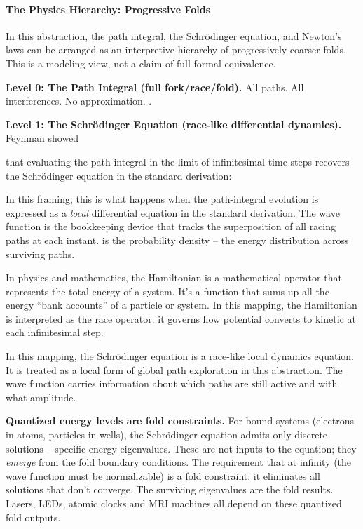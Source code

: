 \documentclass[
]{article}
\begin{document}
\paragraph{\texorpdfstring{\textbf{The Physics Hierarchy: Progressive
Folds}}{The Physics Hierarchy: Progressive Folds}}\label{the-physics-hierarchy-progressive-folds}

In this abstraction, the path integral, the Schrödinger equation, and
Newton's laws can be arranged as an interpretive hierarchy of
progressively coarser folds. This is a modeling view, not a claim of
full formal equivalence.

\textbf{Level 0: The Path Integral (full fork/race/fold).} All paths.
All interferences. No approximation. .

\textbf{Level 1: The Schrödinger Equation (race-like differential
dynamics).} Feynman showed

that evaluating the path integral in the limit of infinitesimal time
steps recovers the Schrödinger equation in the standard derivation:

In this framing, this is what happens when the path-integral evolution
is expressed as a \emph{local} differential equation in the standard
derivation. The wave function is the bookkeeping device that tracks the
superposition of all racing paths at each instant. is the probability
density -- the energy distribution across surviving paths.

In physics and mathematics, the Hamiltonian is a mathematical operator
that represents the total energy of a system. It's a function that sums
up all the energy ``bank accounts'' of a particle or system. In this
mapping, the Hamiltonian is interpreted as the race operator: it governs
how potential converts to kinetic at each infinitesimal step.

In this mapping, the Schrödinger equation is a race-like local dynamics
equation. It is treated as a local form of global path exploration in
this abstraction. The wave function carries information about which
paths are still active and with what amplitude.

\textbf{Quantized energy levels are fold constraints.} For bound systems
(electrons in atoms, particles in wells), the Schrödinger equation
admits only discrete solutions -- specific energy eigenvalues. These are
not inputs to the equation; they \emph{emerge} from the fold boundary
conditions. The requirement that at infinity (the wave function must be
normalizable) is a fold constraint: it eliminates all solutions that
don't converge. The surviving eigenvalues are the fold results. Lasers,
LEDs, atomic clocks and MRI machines all depend on these quantized fold
outputs.
\end{document}
